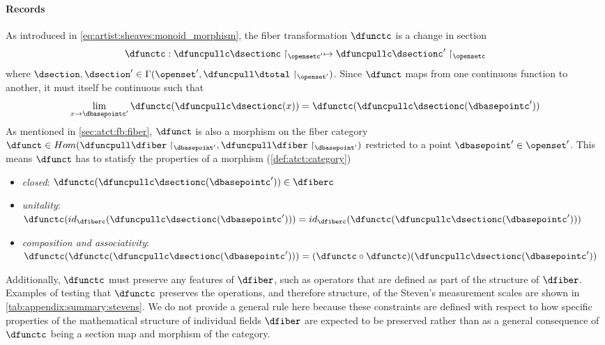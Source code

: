\documentclass[10pt,journal,compsoc]{IEEEtran}
\theoremstyle{definition}
\theoremstyle{remark}
\begin{document}
\paragraph{\textbf{Records}}
As introduced in \autoref{eq:artist:sheaves:monoid_morphism}, the fiber transformation $\dfunctc$ is a change in section 
\begin{equation}
  \label{eq:atct:morphism:fiber}
  \dfunctc: \dfuncpullc \dsectionc \restriction_{\opensetc^{\prime}} \mapsto \dfuncpullc \dsectionc^{\prime} \restriction_{\opensetc}
\end{equation}
where $\dsection, \dsection^{\prime} \in \Gamma(\openset^{\prime}, \dfuncpull\dtotal\restriction_{\openset^{\prime}})$. Since $\dfunct$ maps from one continuous function to another, it must itself be continuous such that
\begin{equation}
  \label{eq:atct:morphism:fiber:continuity}
   \lim\limits_{x \rightarrow \dbasepointc^{\prime}}\dfunctc(\dfuncpullc\dsectionc(x)) =  \dfunctc(\dfuncpullc\dsectionc(\dbasepointc^{\prime}))
\end{equation}
As mentioned in \autoref{sec:atct:fb:fiber}, $\dfunct$ is also  
a morphism on the fiber category $\dfunct \in Hom(\dfuncpull\dfiber\restriction_{\dbasepoint^{\prime}},\dfuncpull\dfiber\restriction_{\dbasepoint^{\prime}})$ restricted to a point $\dbasepoint^{\prime} \in \openset^{\prime}$. This means $\dfunct$ has to statisfy the properties of a morphism (\autoref{def:atct:category})
\begin{itemize}
  \item \textit{closed}: $\dfunctc(\dfuncpullc\dsectionc(\dbasepointc^{\prime})) \in \dfiberc$
  \item \textit{unitality}: $\dfunctc(id_{\dfiberc}(\dfuncpullc\dsectionc(\dbasepointc^{\prime}))) = id_{\dfiberc}(\dfunctc(\dfuncpullc\dsectionc(\dbasepointc^{\prime})))$
  \item \textit{composition and associativity}: \\
  $\dfunctc(\dfunctc(\dfuncpullc\dsectionc(\dbasepointc^{\prime}))) = (\dfunctc\circ\dfunctc)(\dfuncpullc\dsectionc(\dbasepointc^{\prime}))$
\end{itemize}

Additionally, $\dfunctc$ must preserve any features of $\dfiber$, such as operators that are defined as part of the structure of $\dfiber$. Examples of testing that $\dfunctc$ preserves the operations, and therefore structure, of the Steven's measurement scales are shown in \autoref{tab:appendix:summary:stevens}. We do not provide a general rule here because these constraints are defined with respect to how specific properties of the mathematical structure of individual fields $\dfiber$ are expected to be preserved rather than as a general consequence of $\dfunctc$ being a section map and morphism of the category. 
\end{document}
